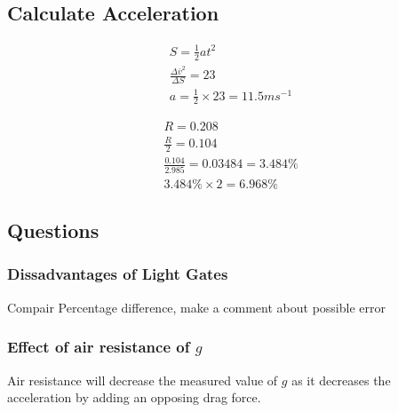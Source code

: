 \documentclass{article}
\begin{document}
\begin{center}
\end{center}

\subsection{Calculate Acceleration}

\begin{gather}
	S = \frac{1}{2} at^2 \\
	\frac{\Delta \bar{v}^2}{\Delta{S}} = 23 \\
	a = \frac{1}{2} \times 23 = 11.5 \si{ms^{-1}}
\end{gather}

\begin{gather}
	R = 0.208 \\
	\frac{R}{2} = 0.104 \\
    \frac{0.104}{2.985} = 0.03484 = 3.484\% \\
	3.484 \% \times 2 = 6.968 \%
\end{gather}

\subsection{Questions}
\subsubsection{Dissadvantages of Light Gates}
Compair Percentage difference, make a comment about possible error

\subsubsection{Effect of air resistance of $g$}
Air resistance will decrease the measured value of $g$ as it decreases the acceleration
by adding an opposing drag force.
\end{document}
